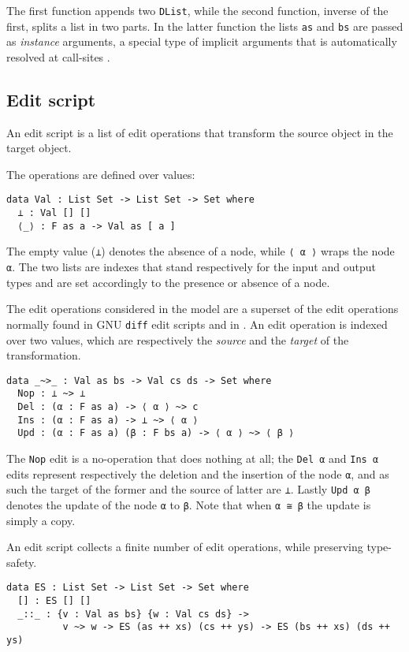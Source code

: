 \documentclass[../Thesis.tex]{subfiles}
\begin{document}
	The first function appends two \texttt{DList}, while the second function,
	inverse of the first, splits a list in two parts.
	In the latter function the lists \texttt{as} and \texttt{bs} are passed
	as \emph{instance} arguments, a special type of implicit arguments 
	that is automatically resolved at call-sites \cite{Devriese11}.
		 
	\subsection{Edit script}
	\label{subsec:EditScript}
	An edit script is a list of edit operations that transform the source object in
	the target object.

	The operations are defined over values:
		
\begin{verbatim}
data Val : List Set -> List Set -> Set where
  ⊥ : Val [] []
  ⟨_⟩ : F as a -> Val as [ a ] 
\end{verbatim}
	The empty value (\texttt{⊥}) denotes the absence of a node,
	while \texttt{⟨ α ⟩} wraps the node \texttt{α}.
	The two lists are indexes that stand respectively for the input and 
	output types and are set accordingly to the presence or absence 
	of a node.
	
	The edit operations considered in the model are a superset of the edit
	operations normally found in GNU \texttt{diff} edit scripts and in 
	\cite{Lemp09}.
	An edit operation is indexed over two values, which are respectively
	the \emph{source} and the \emph{target} of the transformation.
	
\begin{verbatim}
data _~>_ : Val as bs -> Val cs ds -> Set where
  Nop : ⊥ ~> ⊥
  Del : (α : F as a) -> ⟨ α ⟩ ~> c
  Ins : (α : F as a) -> ⊥ ~> ⟨ α ⟩
  Upd : (α : F as a) (β : F bs a) -> ⟨ α ⟩ ~> ⟨ β ⟩
\end{verbatim}
	
	The \texttt{Nop} edit is a no-operation that does nothing
	at all; the \texttt{Del α} and \texttt{Ins α} edits represent 
	respectively the deletion and the insertion of the node \texttt{α}, and as 
	such the target of the former and the source of latter are \texttt{⊥}.
	Lastly \texttt{Upd α β} denotes the update of the node \texttt{α}
	to \texttt{β}. Note that when \texttt{α ≅ β} the update is simply a copy.

	An edit script collects a finite number of edit operations, 
	while preserving type-safety.
\begin{verbatim}
data ES : List Set -> List Set -> Set where
  [] : ES [] []
  _::_ : {v : Val as bs} {w : Val cs ds} -> 
          v ~> w -> ES (as ++ xs) (cs ++ ys) -> ES (bs ++ xs) (ds ++ ys)
\end{verbatim}
\end{document}
